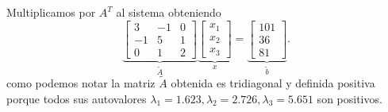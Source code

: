 \begin{frame}
\begin{solution}
\begin{enumerate}[b)]
			      Multiplicamos por $A^{T}$ al sistema obteniendo
			      \begin{equation*}
				      \underbrace{
					      \begin{bmatrix}
						      3  & -1 & 0 \\
						      -1 & 5  & 1 \\
						      0  & 1  & 2
					      \end{bmatrix}
				      }_{\displaystyle \widetilde{A}}
				      \underbrace{
					      \begin{bmatrix}
						      x_{1} \\
						      x_{2} \\
						      x_{3}
					      \end{bmatrix}
				      }_{\displaystyle x}
				      =
				      \underbrace{
					      \begin{bmatrix}
						      101 \\
						      36  \\
						      81
					      \end{bmatrix}
				      }_{\displaystyle \widetilde{b}}.
			      \end{equation*}
			      como podemos notar la matriz $\widetilde{A}$ obtenida es
			      tridiagonal y definida positiva porque todos sus
			      autovalores
			      \begin{math}
				      \lambda_{1}=1.623,
				      \lambda_{2}=2.726,
				      \lambda_{3}=5.651
			      \end{math}
			      son positivos.
		\end{enumerate}
	\end{solution}
\end{frame}

